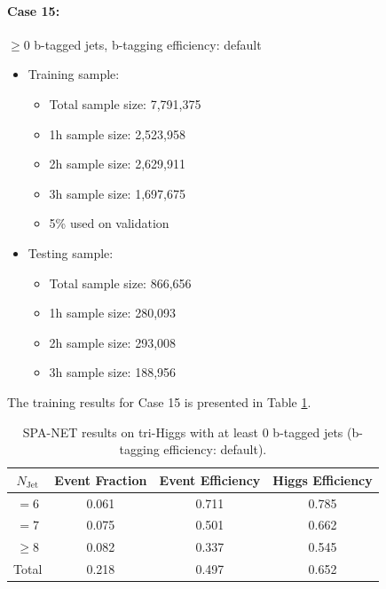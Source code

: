 \documentclass[12pt]{article}
\begin{document}
		\paragraph{Case 15:} $\ge 0$ b-tagged jets, b-tagging efficiency: default
		\begin{itemize}
			\item Training sample:
			\begin{itemize}
				\item Total sample size: 7,791,375
				\item 1h sample size: 2,523,958
				\item 2h sample size: 2,629,911
				\item 3h sample size: 1,697,675
				\item 5\% used on validation
			\end{itemize}
			\item Testing sample: 
				\begin{itemize}
					\item Total sample size: 866,656
					\item 1h sample size: 280,093
					\item 2h sample size: 293,008
					\item 3h sample size: 188,956
				\end{itemize}
		\end{itemize}
		The training results for Case 15 is presented in Table \ref{tab:SPANet_triHiggs_0btag_default_15M}.
		\begin{table}[htpb]
			\centering
			\caption{SPA-NET results on tri-Higgs with at least 0 b-tagged jets (b-tagging efficiency: default).}
			\label{tab:SPANet_triHiggs_0btag_default_15M}
			\begin{tabular}{c|c|cc}
				$N_\text{Jet}$ & Event Fraction & Event Efficiency & Higgs Efficiency \\
				\hline
				$=6$	  &   0.061             &    0.711              &    0.785             \\
				$=7$	  &   0.075             &    0.501              &    0.662             \\
				$\ge 8$	  &   0.082             &    0.337              &    0.545             \\
				Total	  &   0.218             &    0.497              &    0.652             \\
			\end{tabular}
		\end{table}
\end{document}
